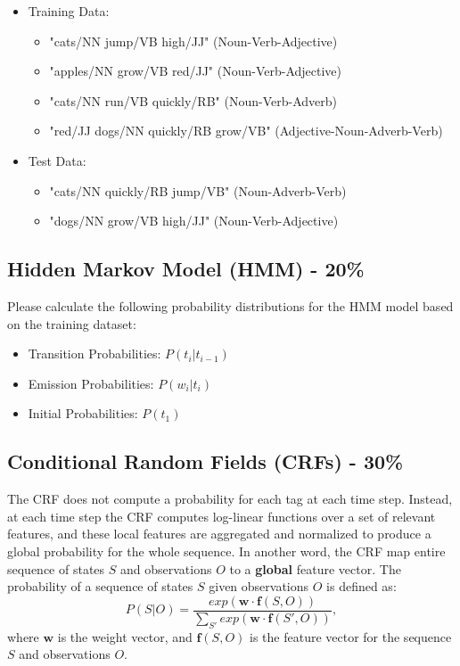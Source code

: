 \documentclass{article}
\begin{document}
\begin{itemize}
    \item Training Data:
    \begin{itemize}
        \item "cats/NN jump/VB high/JJ" (Noun-Verb-Adjective)
        \item "apples/NN grow/VB red/JJ" (Noun-Verb-Adjective)
        \item "cats/NN run/VB quickly/RB" (Noun-Verb-Adverb)
        \item "red/JJ dogs/NN quickly/RB grow/VB" (Adjective-Noun-Adverb-Verb)
    \end{itemize}
    
    \item Test Data:
    \begin{itemize}
        \item "cats/NN quickly/RB jump/VB" (Noun-Adverb-Verb)
        \item "dogs/NN grow/VB high/JJ" (Noun-Verb-Adjective)
    \end{itemize}
\end{itemize}

\subsection*{Hidden Markov Model (HMM) - 20\%}

Please calculate the following probability distributions for the HMM model
based on the training dataset:

\begin{itemize}
    \item Transition Probabilities: $P(t_{i}|t_{i-1})$
    \item Emission Probabilities: $P(w_{i}|t_{i})$
    \item Initial Probabilities: $P(t_{1})$
\end{itemize}


\subsection*{Conditional Random Fields (CRFs) - 30\%}

The CRF does not compute a probability for each tag at each time step. 
Instead, at each time step the CRF computes log-linear functions over 
a set of relevant features, and these local features are aggregated and 
normalized to produce a global probability for the whole sequence.
In another word, the CRF map entire sequence of states $S$ and
observations $O$ to a \textbf{global} feature vector.
The probability of a sequence of states $S$ given observations $O$ is defined as:
$$P(S|O) = \frac{exp(\mathbf{w}\cdot \mathbf{f}(S, O) )}{ {\textstyle \sum_{S'}^{}exp(\mathbf{w}\cdot \mathbf{f}(S', O) )} },$$
where $\mathbf{w}$ is the weight vector, 
and $\mathbf{f}(S, O)$ is the feature vector for the sequence $S$ and observations $O$.
\end{document}
